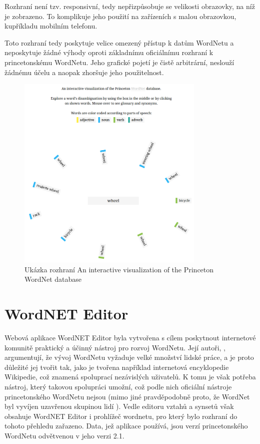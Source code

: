 \documentclass[a4paper, 11pt, oneside]{book}
\begin{document}
				Rozhraní není tzv. responsivní, tedy nepřizpůsobuje se velikosti obrazovky, na níž je zobrazeno. To komplikuje jeho použití na zařízeních s malou obrazovkou, kupříkladu mobilním telefonu.

				Toto rozhraní tedy poskytuje velice omezený přístup k datům WordNetu a neposkytuje žádné výhody oproti základnímu oficiálnímu rozhraní k princetonskému WordNetu. Jeho grafické pojetí je čistě arbitrární, neslouží žádnému účelu a naopak zhoršuje jeho použitelnost.

				\begin{figure}[h]
					\centering
					\includegraphics[width=0.8\textwidth]{intviswn.png}
					\caption{Ukázka rozhraní An interactive visualization of the Princeton WordNet database}
					\label{fig:intviswn}
				\end{figure}

			\section{WordNET Editor}
			\label{wnvis:wncoledit}

				Webová aplikace WordNET Editor byla vytvořena s cílem poskytnout internetové komunitě praktický a účinný nástroj pro rozvoj WordNetu. Její autoři, \textcite{szymanski2007cooperative}, argumentují, že vývoj WordNetu vyžaduje velké množství lidské práce, a je proto důležité jej tvořit tak, jako je tvořena například internetová encyklopedie Wikipedie, což znamená spoluprací nezávislých uživatelů. K tomu je však potřeba nástroj, který takovou spolupráci umožní, což podle nich oficiální nástroje princetonského WordNetu nejsou (mimo jiné pravděpodobně proto, že WordNet byl vyvíjen uzavřenou skupinou lidí \parencite{fellbaum2005wordnets}). Vedle editoru vztahů a synsetů však obsahuje WordNET Editor i prohlížeč wordnetu, pro který bylo rozhraní do tohoto přehledu zařazeno. Data, jež aplikace používá, jsou verzí princetonského WordNetu odvětvenou v jeho verzi 2.1. \parencite{szymanski2007cooperative}
\end{document}
